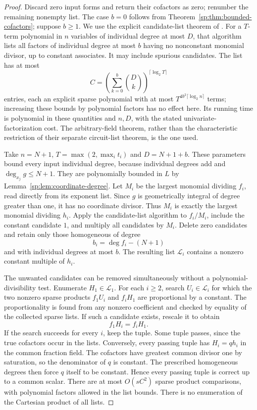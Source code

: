 \begin{proof}
Discard zero input forms and return their cofactors as zero; renumber
the remaining nonempty list.
The case $b=0$ follows from
Theorem~\ref{sp:thm:bounded-cofactors}; suppose $b\geq1$.
We use the explicit candidate-list theorem of
\citet[Theorems~1.7 and~5.1; Remark~1.9]{sp-bkrs}. For a $T$-term
polynomial in $n$ variables of individual degree at most $D$, that
algorithm lists all factors of individual degree at most $b$ having
no nonconstant monomial divisor, up to constant associates. It may
include spurious candidates. The list has at most
\[
 C=\left(\sum_{k=0}^{b}\binom Dk\right)^{\lceil\log_2T\rceil}
\]
entries, each an explicit sparse polynomial with at most
$T^{4b^2\lceil\log_2n\rceil}$ terms; increasing these bounds by
polynomial factors has no effect here. Its running time is polynomial
in these quantities and $n,D$, with the stated univariate-factorization
cost. The arbitrary-field theorem, rather than the characteristic
restriction of their separate circuit-list theorem, is the one used.

Take $n=N+1$, $T=\max(2,\max_i t_i)$ and $D=N+1+b$.
These parameters bound every input individual degree, because individual
degrees add and $\deg_{x_j}g\leq N+1$. They are polynomially bounded
in $L$ by Lemma~\ref{sp:lem:coordinate-degree}.
Let $M_i$ be the largest monomial dividing $f_i$, read directly from
its exponent list. Since $g$ is geometrically integral of degree greater
than one, it has no coordinate divisor. Thus $M_i$ is exactly the
largest monomial dividing $h_i$.
Apply the candidate-list algorithm to $f_i/M_i$, include the constant
candidate $1$, and multiply all candidates by $M_i$. Delete zero
candidates and retain only those homogeneous of degree
\[
 b_i=\deg f_i-(N+1)
\]
and with individual degrees at most $b$. The resulting list
$\mathcal L_i$ contains a nonzero constant multiple of $h_i$.

The unwanted candidates can be removed simultaneously without a
polynomial-divisibility test. Enumerate $H_1\in\mathcal L_1$.
For each $i\geq2$, search $U_i\in\mathcal L_i$ for which the two
nonzero sparse products $f_1U_i$ and $f_iH_1$ are proportional by a
constant. The proportionality is found from any nonzero coefficient
and checked by equality of the collected sparse lists. If such a
candidate exists, rescale it to obtain
\[
 f_1H_i=f_iH_1.
\]
If the search succeeds for every $i$, keep the tuple. Some tuple passes,
since the true cofactors occur in the lists. Conversely, every passing
tuple has $H_i=q h_i$ in the common fraction field. The cofactors
have greatest common divisor one by saturation, so the denominator
of $q$ is constant. The prescribed homogeneous degrees then force
$q$ itself to be constant. Hence every passing tuple is correct up
to a common scalar. There are at most $O(sC^2)$ sparse product
comparisons, with polynomial factors allowed in the list bounds.
There is no enumeration of the Cartesian product of all lists.


\end{proof}
